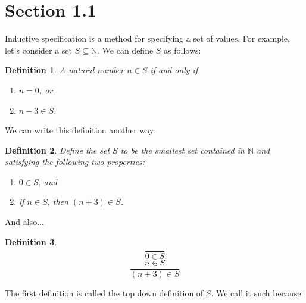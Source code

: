 \documentclass{article}
\newtheorem{mydef}{Definition}
\begin{document}
\section*{Section 1.1}
Inductive specification is a method for specifying a set of values. For example, let's consider a set $ S \subseteq \mathbb{N} $. We can define $S$ as follows: 
\begin{mydef} \textit{A natural number} $n \in S$ \textit{if and only if}  
\begin{enumerate} 
  \item $n = 0$, or 
  \item $ n - 3 \in S $. 
\end{enumerate}
\end{mydef} 
We can write this definition another way: 
\begin{mydef} \textit{Define the set $S$ to be the smallest set contained in $\mathbb{N}$ and satisfying the following two properties:} 
\begin{enumerate}
  \item $0 \in S$, and 
  \item if $n \in S$, then $(n + 3) \in S$. 
\end{enumerate}
\end{mydef}
And also...
\begin{mydef} $$ \frac{}{0 \in S}$$ $$ \frac{n \in S}{(n + 3) \in S} $$ 
\end{mydef}

The first definition is called the top down definition of $S$. We call it such because 
\end{document}
